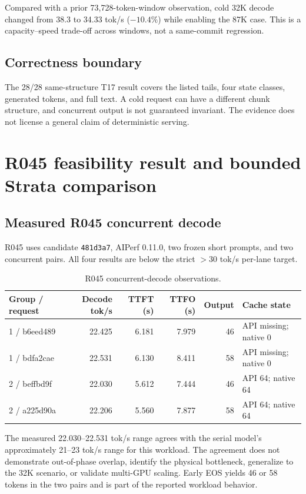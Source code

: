 \documentclass[11pt]{article}
\begin{document}
Compared with a prior 73,728-token-window observation, cold 32K decode changed from 38.3 to 34.33 tok/s ($-10.4\%$) while enabling the 87K case. This is a capacity--speed trade-off across windows, not a same-commit regression.

\subsection{Correctness boundary}

The 28/28 same-structure T17 result covers the listed tails, four state classes, generated tokens, and full text. A cold request can have a different chunk structure, and concurrent output is not guaranteed invariant. The evidence does not license a general claim of deterministic serving.

\section{R045 feasibility result and bounded Strata comparison}

\subsection{Measured R045 concurrent decode}

R045 uses candidate \texttt{481d3a7}, AIPerf 0.11.0, two frozen short prompts, and two concurrent pairs. All four results are below the strict $>30$ tok/s per-lane target.

\begin{table}[t]
\centering
\scriptsize
\begin{tabular}{lrrrrl}
\toprule
Group / request & Decode tok/s & TTFT (s) & TTFO (s) & Output & Cache state \\
\midrule
1 / b6eed489 & 22.425 & 6.181 & 7.979 & 46 & API missing; native 0 \\
1 / bdfa2cae & 22.531 & 6.130 & 8.411 & 58 & API missing; native 0 \\
2 / beffbd9f & 22.030 & 5.612 & 7.444 & 46 & API 64; native 64 \\
2 / a225d90a & 22.206 & 5.560 & 7.877 & 58 & API 64; native 64 \\
\bottomrule
\end{tabular}
\caption{R045 concurrent-decode observations.}
\label{tab:r045}
\end{table}

The measured 22.030--22.531 tok/s range agrees with the serial model's approximately 21--23 tok/s range for this workload. The agreement does not demonstrate out-of-phase overlap, identify the physical bottleneck, generalize to the 32K scenario, or validate multi-GPU scaling. Early EOS yields 46 or 58 tokens in the two pairs and is part of the reported workload behavior.
\end{document}
